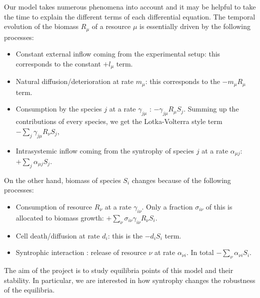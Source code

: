 \documentclass[12pt, titlepage]{report}
\begin{document}
Our model takes numerous phenomena into account and it may be helpful to take the time to explain the different terms of each differential equation. The temporal evolution of the biomass $R_\mu$ of a resource $\mu$ is essentially driven by the following processes:
\begin{itemize}
  \item Constant external inflow coming from the experimental setup: this corresponds to the constant $+l_\mu$ term.
  \item Natural diffusion/deterioration at rate $m_\mu$: this corresponds to the $-m_\mu R_\mu$ term.
  \item Consumption by the species $j$ at a rate $\gamma_{j\mu}$ : $-\gamma_{j\mu} R_\mu S_j$. Summing up the contributions of every species, we get the Lotka-Volterra style \cite{lotka_analytical_1920} term  $-\sum_j \gamma_{j\mu}R_\nu S_j$,
  \item Intrasystemic inflow coming from the syntrophy of species $j$ at a rate $\alpha_{\mu j}$: $+\sum_j \alpha_{\mu j} S_j$.
\end{itemize}
On the other hand, biomass of species $S_i$ changes because of the following processes:
\begin{itemize}
  \item Consumption of resource $R_\nu$ at a rate $\gamma_{i\nu}$. Only a fraction $\sigma_{i\nu}$ of this is allocated to biomass growth: $+\sum_\nu \sigma_{i\nu} \gamma_{i\nu}R_\nu S_i$.
  \item Cell death/diffusion at rate $d_i$: this is the $-d_i S_i$ term.
  \item Syntrophic interaction : release of resource $\nu$ at rate $\alpha_{\nu i}$. In total $-\sum_\nu \alpha_{\nu i} S_i$.
\end{itemize}
The aim of the project is to study equilibria points of this model and their stability. In particular, we are interested in how syntrophy changes the robustness of the equilibria.
\end{document}
